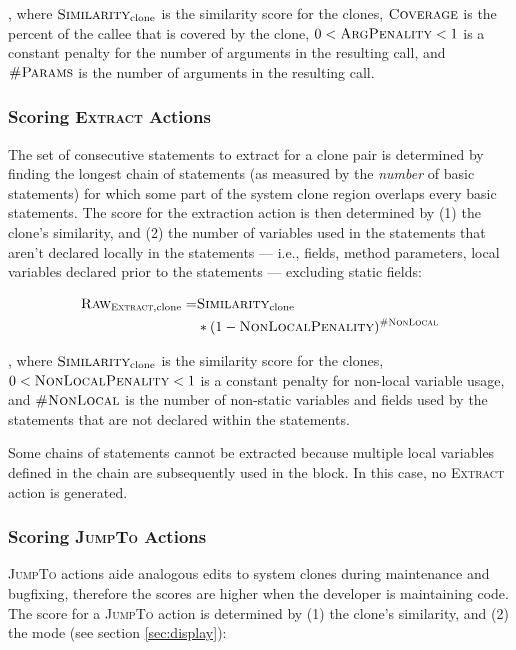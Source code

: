 \documentclass[nocopyrightspace,10pt]{sigplanconf}
\begin{document}
\noindent, where $\textsc{Similarity}_{\text{clone}}$ is the similarity score for the clones, 
$\textsc{Coverage}$ is
the percent of the callee that is covered by the clone, $0 < \textsc{ArgPenality} < 1$ is a constant
penalty for the number of arguments in the resulting call, and $\textsc{\#Params}$ is
the number of arguments in the resulting call. 

\subsubsection{Scoring \textsc{Extract} Actions}
\label{sec:extract}
The set of consecutive statements to extract for a clone pair is
determined by finding the longest chain of statements (as measured by
the \textit{number} of basic statements) for which some part of the
system clone region overlaps every basic statements.
The score for the extraction
action is then determined by (1) the clone's similarity, and (2) the
number of variables used in the statements that aren't declared
locally in the statements --- i.e., fields, method parameters, local
variables declared prior to the statements --- excluding static
fields:

\begin{align*}
  \textsc{Raw}_{\textsc{Extract}, \text{clone}} = & \textsc{Similarity}_{\text{clone}} \\ 
   & * (1 - \textsc{NonLocalPenality})^{\textsc{\#NonLocal}}
\end{align*}

\noindent, where $\textsc{Similarity}_{\text{clone}}$ is the
similarity score for the clones, $0 < \textsc{NonLocalPenality} < 1$
is a constant penalty for non-local variable usage, and
$\textsc{\#NonLocal}$ is the number of non-static variables and fields
used by the statements that are not declared within the statements.

Some chains of statements cannot be extracted because multiple local
variables defined in the chain are subsequently used in the block. In
this case, no \textsc{Extract} action is generated.

\subsubsection{Scoring \textsc{JumpTo} Actions}
\textsc{JumpTo} actions aide analogous edits to system clones
during maintenance and bugfixing, therefore the scores are higher when
the developer is maintaining code. The score for a \textsc{JumpTo} action
is determined by (1) the clone's similarity, and (2) the mode (see
section \ref{sec:display}):
\end{document}
